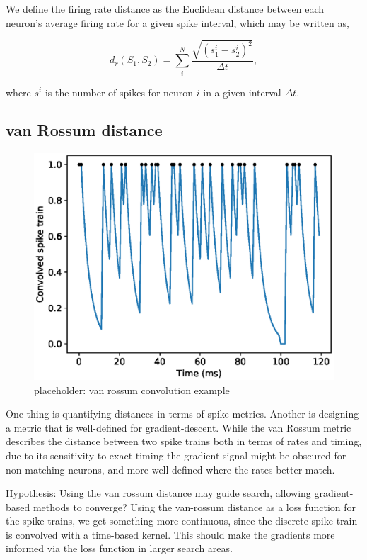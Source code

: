 \documentclass[mphil,deptreport,ianc]{infthesis} %
\begin{document}
We define the firing rate distance as the Euclidean distance between each neuron's average firing rate for a given spike interval, which may be written as,

\begin{equation}
    d_r(S_1, S_2) = \sum_i^N{\frac{\sqrt{(s_1^i - s_2^i)^2}}{\Delta t}},
\end{equation}

where $s^i$ is the number of spikes for neuron $i$ in a given interval $\Delta t$.

\subsection{van Rossum distance}

\begin{figure}
    \centering
    \vskip -0.1in
    \includegraphics[width=0.9\columnwidth]{figures/samples/neur_vr_conv_sample.eps}
    \vskip -0.1in
    \caption{placeholder: van rossum convolution example}
    \label{fig:vrd_conv_sample}
    \vskip -0.2in
\end{figure}

One thing is quantifying distances in terms of spike metrics.
Another is designing a metric that is well-defined for gradient-descent.
While the van Rossum metric describes the distance between two spike trains both in terms of rates and timing, due to its sensitivity to exact timing the gradient signal might be obscured for non-matching neurons, and more well-defined where the rates better match.

Hypothesis: Using the van rossum distance may guide search, allowing gradient-based methods to converge?
Using the van-rossum distance as a loss function for the spike trains, we get something more continuous, since the discrete spike train is convolved with a time-based kernel. 
This should make the gradients more informed via the loss function in larger search areas.
\end{document}
